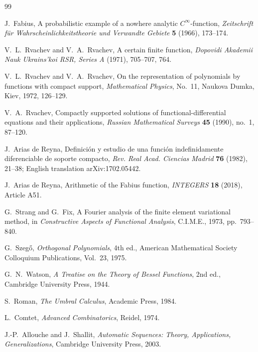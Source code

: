 \documentclass[11pt,oneside]{article}
\numberwithin{equation}{section}
\theoremstyle{definition}
\theoremstyle{remark}
\begin{document}
\begin{thebibliography}{99}

J.~Fabius,
\newblock A probabilistic example of a nowhere analytic $C^\infty$-function,
\newblock \emph{Zeitschrift f\"ur Wahrscheinlichkeitstheorie und Verwandte
Gebiete} \textbf{5} (1966), 173--174.

V.~L.~Rvachev and V.~A.~Rvachev,
\newblock A certain finite function,
\newblock \emph{Dopovidi Akademii Nauk Ukrains'koi RSR, Series A} (1971),
705--707, 764.

V.~L.~Rvachev and V.~A.~Rvachev,
\newblock On the representation of polynomials by functions with compact
support,
\newblock \emph{Mathematical Physics}, No.~11, Naukova Dumka, Kiev, 1972,
126--129.

V.~A.~Rvachev,
\newblock Compactly supported solutions of functional-differential equations
and their applications,
\newblock \emph{Russian Mathematical Surveys} \textbf{45} (1990), no.~1,
87--120.

J.~Arias de Reyna,
\newblock Definici\'on y estudio de una funci\'on indefinidamente diferenciable
de soporte compacto,
\newblock \emph{Rev. Real Acad. Ciencias Madrid} \textbf{76} (1982), 21--38;
English translation arXiv:1702.05442.

J.~Arias de Reyna,
\newblock Arithmetic of the Fabius function,
\newblock \emph{INTEGERS} \textbf{18} (2018), Article A51.

G.~Strang and G.~Fix,
\newblock A Fourier analysis of the finite element variational method,
\newblock in \emph{Constructive Aspects of Functional Analysis}, C.I.M.E.,
1973, pp.~793--840.

G.~Szeg\H{o},
\newblock \emph{Orthogonal Polynomials}, 4th ed.,
\newblock American Mathematical Society Colloquium Publications, Vol.~23,
1975.

G.~N.~Watson,
\newblock \emph{A Treatise on the Theory of Bessel Functions}, 2nd ed.,
\newblock Cambridge University Press, 1944.

S.~Roman,
\newblock \emph{The Umbral Calculus},
\newblock Academic Press, 1984.

L.~Comtet,
\newblock \emph{Advanced Combinatorics},
\newblock Reidel, 1974.

J.-P.~Allouche and J.~Shallit,
\newblock \emph{Automatic Sequences: Theory, Applications, Generalizations},
\newblock Cambridge University Press, 2003.


\end{thebibliography}
\end{document}
